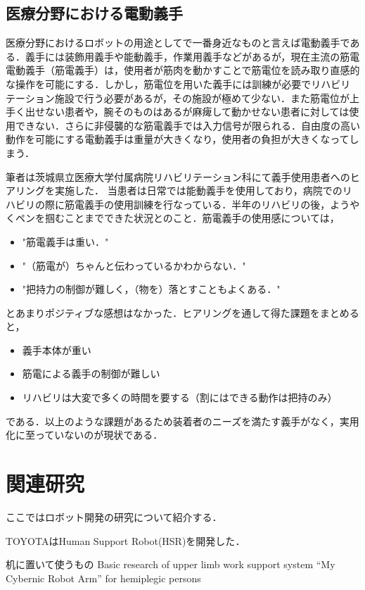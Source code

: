 \subsection{医療分野における電動義手}
医療分野におけるロボットの用途としてで一番身近なものと言えば電動義手である．義手には装飾用義手や能動義手，作業用義手などがあるが，現在主流の筋電電動義手（筋電義手）は，使用者が筋肉を動かすことで筋電位を読み取り直感的な操作を可能にする．しかし，筋電位を用いた義手には訓練が必要でリハビリテーション施設で行う必要があるが，その施設が極めて少ない\cite{リハビリテーション}．また筋電位が上手く出せない患者や，腕そのものはあるが麻痺して動かせない患者に対しては使用できない．さらに非侵襲的な筋電義手では入力信号が限られる．自由度の高い動作を可能にする電動義手は重量が大きくなり，使用者の負担が大きくなってしまう．

筆者は茨城県立医療大学付属病院リハビリテーション科にて義手使用患者へのヒアリングを実施した．
当患者は日常では能動義手を使用しており，病院でのリハビリの際に筋電義手の使用訓練を行なっている．半年のリハビリの後，ようやくペンを掴むことまでできた状況とのこと．筋電義手の使用感については，
\begin{itemize}
    \item "筋電義手は重い．"
    \item "（筋電が）ちゃんと伝わっているかわからない．"
    \item "把持力の制御が難しく，（物を）落とすこともよくある．"
\end{itemize}
とあまりポジティブな感想はなかった．ヒアリングを通して得た課題をまとめると，
\begin{itemize}
    \item 義手本体が重い
    \item 筋電による義手の制御が難しい
    \item リハビリは大変で多くの時間を要する（割にはできる動作は把持のみ）
\end{itemize}
である．以上のような課題があるため装着者のニーズを満たす義手がなく，実用化に至っていないのが現状である．


\section{関連研究}
ここではロボット開発の研究について紹介する．

TOYOTAはHuman Support Robot(HSR)を開発した\cite{HSR}．



机に置いて使うもの
Basic research of upper limb work support system “My Cybernic Robot Arm” for hemiplegic persons\cite{Sankai2018}




